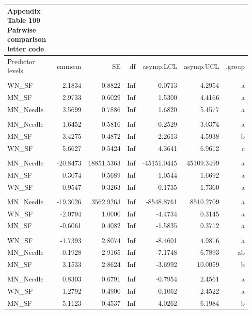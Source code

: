 \documentclass[
  12pt,
  letterpaper,
]{article}
\begin{document}
\begingroup
\fontsize{12.0pt}{14.4pt}\selectfont
\begin{longtable}{l|rrrrrr}
\caption*{
{\large \textbf{Appendix Table 109}} \\ 
{\small \textbf{Pairwise comparison letter code}}
} \\ 
\toprule
Predictor levels & {emmean} & {SE} & {df} & {asymp.LCL} & {asymp.UCL} & {.group} \\ 
\midrule\addlinespace[2.5pt]
\multicolumn{7}{l}{Brain} \\[2.5pt] 
\midrule\addlinespace[2.5pt]
WN\_SF & 2.1834 & 0.8822 & Inf & 0.0713 & 4.2954 &  a \\ 
MN\_SF & 2.9733 & 0.6029 & Inf & 1.5300 & 4.4166 &  a \\ 
MN\_Needle & 3.5699 & 0.7886 & Inf & 1.6820 & 5.4577 &  a \\ 
\midrule\addlinespace[2.5pt]
\multicolumn{7}{l}{Ear} \\[2.5pt] 
\midrule\addlinespace[2.5pt]
MN\_Needle & 1.6452 & 0.5816 & Inf & 0.2529 & 3.0374 &  a   \\ 
MN\_SF & 3.4275 & 0.4872 & Inf & 2.2613 & 4.5938 &   b  \\ 
WN\_SF & 5.6627 & 0.5424 & Inf & 4.3641 & 6.9612 &    c \\ 
\midrule\addlinespace[2.5pt]
\multicolumn{7}{l}{Eye} \\[2.5pt] 
\midrule\addlinespace[2.5pt]
MN\_Needle & -20.8473 & 18851.5363 & Inf & -45151.0445 & 45109.3499 &  a \\ 
MN\_SF & 0.3074 & 0.5689 & Inf & -1.0544 & 1.6692 &  a \\ 
WN\_SF & 0.9547 & 0.3263 & Inf & 0.1735 & 1.7360 &  a \\ 
\midrule\addlinespace[2.5pt]
\multicolumn{7}{l}{Liver} \\[2.5pt] 
\midrule\addlinespace[2.5pt]
MN\_Needle & -19.3026 & 3562.9263 & Inf & -8548.8761 & 8510.2709 &  a \\ 
WN\_SF & -2.0794 & 1.0000 & Inf & -4.4734 & 0.3145 &  a \\ 
MN\_SF & -0.6061 & 0.4082 & Inf & -1.5835 & 0.3712 &  a \\ 
\midrule\addlinespace[2.5pt]
\multicolumn{7}{l}{Paw} \\[2.5pt] 
\midrule\addlinespace[2.5pt]
WN\_SF & -1.7393 & 2.8074 & Inf & -8.4601 & 4.9816 &  a  \\ 
MN\_Needle & -0.1928 & 2.9165 & Inf & -7.1748 & 6.7893 &  ab \\ 
MN\_SF & 3.1533 & 2.8624 & Inf & -3.6992 & 10.0059 &   b \\ 
\midrule\addlinespace[2.5pt]
\multicolumn{7}{l}{Spleen} \\[2.5pt] 
\midrule\addlinespace[2.5pt]
MN\_Needle & 0.8303 & 0.6791 & Inf & -0.7954 & 2.4561 &  a  \\ 
WN\_SF & 1.2792 & 0.4900 & Inf & 0.1062 & 2.4522 &  a  \\ 
MN\_SF & 5.1123 & 0.4537 & Inf & 4.0262 & 6.1984 &   b \\ 
\bottomrule
\end{longtable}
\endgroup
\end{document}

